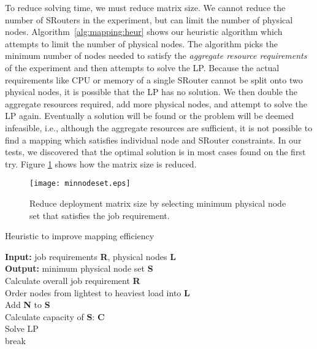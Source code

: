 \documentclass[conference]{IEEEtran}
\begin{document}
To reduce solving time, we must reduce matrix size. We cannot reduce
the number of SRouters in the experiment, but can limit the number of
physical nodes. Algorithm~\ref{alg:mapping:heur} shows our heuristic
algorithm which attempts to limit the number of physical nodes. The
algorithm picks the minimum number of nodes needed to satisfy the
\emph{aggregate resource requirements} of the experiment and then
attempts to solve the LP. Because the actual requirements like CPU or
memory of a single SRouter cannot be split onto two physical nodes, it
is possible that the LP has no solution. We then double the aggregate
resources required, add more physical nodes, and attempt to solve the
LP again. Eventually a solution will be found or the problem will be
deemed infeasible, i.e., although the aggregate resources are
sufficient, it is not possible to find a mapping which satisfies
individual node and SRouter constraints. In our tests, we discovered
that the optimal solution is in most cases found on the first
try. Figure \ref{sec:evaluation:fig:mininodeset} shows how the matrix
size is reduced.








\begin{figure}[!tb]
  \centering
  \texttt{[image: minnodeset.eps]}
  \caption{Reduce deployment matrix size by selecting minimum physical
    node set that satisfies the job requirement.}
  \label{sec:evaluation:fig:mininodeset}
\end{figure}

\begin{algorithm}[!tb]
  \caption{Heuristic to improve mapping efficiency}
  \label{alg:mapping:heur}
  {\textbf{Input:} job requirements \textbf{R}, physical nodes \textbf{L}} \\
  {\textbf{Output:} minimum physical node set \textbf{S}} \\
Calculate overall job requirement \textbf{R} \\
  Order nodes from lightest to heaviest load into \textbf{L} \\
   {
    Add \textbf{N} to \textbf{S} \\
    Calculate capacity of \textbf{S}: \textbf{C} \\
     {
      Solve LP \\
       {
        break \\
      }  } }
\end{algorithm}
\end{document}
